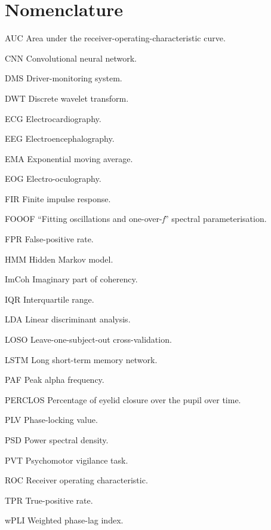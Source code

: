 \documentclass[journal]{IEEEtran}
\DeclareRobustCommand{\add}[1]{#1}                         %
\DeclareRobustCommand{\add}[1]{\hl{#1}}
\begin{document}
\section*{\add{Nomenclature}}
\begin{IEEEdescription}
\item[AUC]     Area under the receiver-operating-characteristic curve.
\item[CNN]     Convolutional neural network.
\item[DMS]     Driver-monitoring system.
\item[DWT]     Discrete wavelet transform.
\item[ECG]     Electrocardiography.
\item[EEG]     Electroencephalography.
\item[EMA]     Exponential moving average.
\item[EOG]     Electro-oculography.
\item[FIR]     Finite impulse response.
\item[FOOOF]   ``Fitting oscillations and one-over-\emph{f}'' spectral parameterisation.
\item[FPR]     False-positive rate.
\item[HMM]     Hidden Markov model.
\item[ImCoh]   Imaginary part of coherency.
\item[IQR]     Interquartile range.
\item[LDA]     Linear discriminant analysis.
\item[LOSO]    Leave-one-subject-out cross-validation.
\item[LSTM]    Long short-term memory network.
\item[PAF]     Peak alpha frequency.
\item[PERCLOS] Percentage of eyelid closure over the pupil over time.
\item[PLV]     Phase-locking value.
\item[PSD]     Power spectral density.
\item[PVT]     Psychomotor vigilance task.
\item[ROC]     Receiver operating characteristic.
\item[TPR]     True-positive rate.
\item[wPLI]    Weighted phase-lag index.
\end{IEEEdescription}

\end{document}

